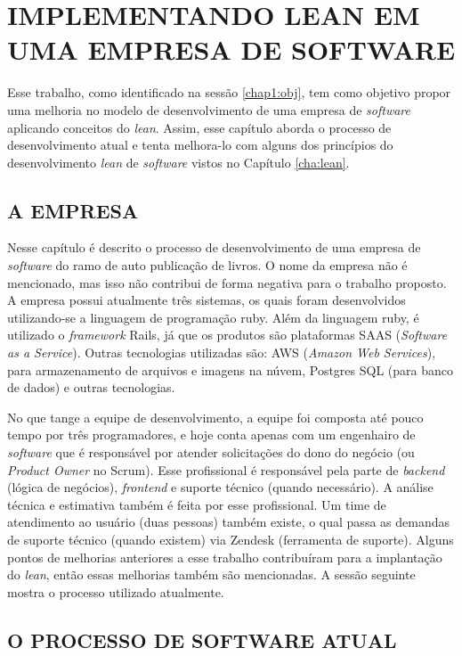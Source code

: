 \chapter{IMPLEMENTANDO LEAN EM UMA EMPRESA DE SOFTWARE}

Esse trabalho, como identificado na sessão \ref{chap1:obj}, tem como objetivo propor uma melhoria no modelo de desenvolvimento de uma empresa de \textit{software} aplicando conceitos do \textit{lean}. Assim, esse capítulo aborda o processo de desenvolvimento atual e tenta melhora-lo com alguns  dos princípios do desenvolvimento \textit{lean} de \textit{software} vistos no Capítulo \ref{cha:lean}.

\section{A EMPRESA}

Nesse capítulo é descrito o processo de desenvolvimento de uma empresa de \textit{software} do ramo de auto publicação de livros. O nome da empresa não é mencionado, mas isso não contribui de forma negativa para o trabalho proposto. A empresa possui atualmente três sistemas, os quais foram desenvolvidos utilizando-se a linguagem de programação ruby. Além da linguagem ruby, é utilizado o \textit{framework} Rails, já que os produtos são plataformas SAAS (\textit{Software as a Service}). Outras tecnologias utilizadas são: AWS (\textit{Amazon Web Services}), para armazenamento de arquivos e imagens na núvem, Postgres SQL (para banco de dados) e outras tecnologias. 

No que tange a equipe de desenvolvimento, a equipe foi composta até pouco tempo por três programadores, e hoje conta apenas com um engenhairo de \textit{software} que é responsável por atender solicitações do dono do negócio (ou \textit{Product Owner} no Scrum). Esse profissional é responsável pela parte de \textit{backend} (lógica de negócios), \textit{frontend} e suporte técnico (quando necessário). A análise técnica e estimativa também é feita por esse profissional. Um time de atendimento ao usuário (duas pessoas) também existe, o qual passa as demandas de suporte técnico (quando existem) via Zendesk (ferramenta de suporte). Alguns pontos de melhorias anteriores a esse trabalho contribuíram para a implantação do \textit{lean}, então essas melhorias também são mencionadas. A sessão seguinte mostra o processo utilizado atualmente.

\section{O PROCESSO DE SOFTWARE ATUAL}
\label{sec:processo_atual}

